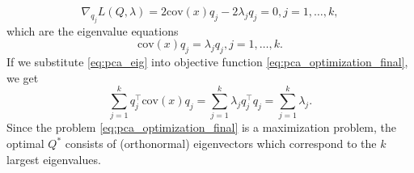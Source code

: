 \begin{equation}
    \nabla_{q_j}L(Q,\lambda) = 2 \text{cov}(x)q_j-2\lambda_jq_j=0, j=1,\dots,k,
\end{equation}
which are the eigenvalue equations
\begin{equation}
    \text{cov}(x)q_j=\lambda_j q_j, j=1,\dots,k.
    \label{eq:pca_eig}
\end{equation}
If we substitute \eqref{eq:pca_eig} into objective function \eqref{eq:pca_optimization_final}, we get
\begin{equation}
    \sum_{j=1}^k q_j^{\top} \text{cov}(x)q_j = \sum_{j=1}^k \lambda_j q_j^{\top}q_j = \sum_{j=1}^k \lambda_j.
\end{equation}
Since the problem \eqref{eq:pca_optimization_final} is a maximization problem, the optimal $Q^*$ consists of (orthonormal) eigenvectors which correspond to the $k$ largest eigenvalues.
